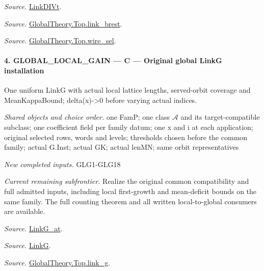 \emph{Source.} \href{https://github.com/CocoSgt/riemann-hypothesis-lean/blob/7cbf7a0c32fca1badf05931879a37c3f8a2b03b4/src/Formalism/SharpRestriction/GlobalTheoremInputs.lean#L94-L96}{LinkDIVt}.

\emph{Source.} \href{https://github.com/CocoSgt/riemann-hypothesis-lean/blob/7cbf7a0c32fca1badf05931879a37c3f8a2b03b4/src/Development/AbelianVarietyTheory/Proofs/GlobalInterpolation/LinkBrest.lean#L7-L25}{GlobalTheory.Top.link\_\allowbreak brest}.

\emph{Source.} \href{https://github.com/CocoSgt/riemann-hypothesis-lean/blob/7cbf7a0c32fca1badf05931879a37c3f8a2b03b4/src/Development/AbelianVarietyTheory/Proofs/GlobalInterpolation/WireSel.lean#L11-L41}{GlobalTheory.Top.wire\_\allowbreak sel}.



\paragraph{4. GLOBAL\_\allowbreak LOCAL\_\allowbreak GAIN — C — Original global LinkG installation}

One uniform LinkG with actual local lattice lengths, served-orbit coverage and MeanKappaBound; delta(x)->0 before varying actual indices.

\emph{Shared objects and choice order.} one FamP; one class $\mathcal A$ and its target-compatible subclass; one coefficient field per family datum; one x and i at each application; original selected rows, words and levels; thresholds chosen before the common family; actual G.Inst; actual GK; actual lenMN; same orbit representatives

\emph{New completed inputs.} GLG1-GLG18

\emph{Current remaining subfrontier.} Realize the original common compatibility and full admitted inputs, including local first-growth and mean-deficit bounds on the same family. The full counting theorem and all written local-to-global consumers are available.

\emph{Source.} \href{https://github.com/CocoSgt/riemann-hypothesis-lean/blob/7cbf7a0c32fca1badf05931879a37c3f8a2b03b4/src/Formalism/SharpRestriction/GlobalTheoremInputs.lean#L122-L137}{LinkG\_\allowbreak at}.

\emph{Source.} \href{https://github.com/CocoSgt/riemann-hypothesis-lean/blob/7cbf7a0c32fca1badf05931879a37c3f8a2b03b4/src/Formalism/SharpRestriction/GlobalTheoremInputs.lean#L138-L141}{LinkG}.

\emph{Source.} \href{https://github.com/CocoSgt/riemann-hypothesis-lean/blob/7cbf7a0c32fca1badf05931879a37c3f8a2b03b4/src/Development/AbelianVarietyTheory/Proofs/GlobalInterpolation/LinkG.lean#L14-L27}{GlobalTheory.Top.link\_\allowbreak g}.



